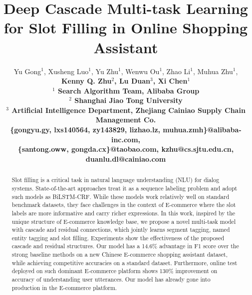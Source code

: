 \documentclass[letterpaper]{article} %
\begin{document}
%
\title{Deep Cascade Multi-task Learning for Slot Filling in Online Shopping Assistant}

\author{
	Yu Gong{$^{1}$\footnotemark[1]\footnotemark[2]},
	Xusheng Luo{$^{1}$\footnotemark[1]},
	Yu Zhu{$^{1}$},
	Wenwu Ou{$^{1}$},
	Zhao Li{$^{1}$},
	Muhua Zhu{$^{1}$},\\
	\bf{\Large{Kenny Q. Zhu{$^{2}$},
	Lu Duan{$^{3}$},
	Xi Chen{$^{1}$}}} \\
	{$^{1}$} Search Algorithm Team, Alibaba Group \\
	{$^{2}$} Shanghai Jiao Tong University \\
	{$^{3}$} Artificial Intelligence Department, Zhejiang Cainiao Supply Chain Management Co.\\
	\{gongyu.gy, lxs140564, zy143829, lizhao.lz, muhua.zmh\}@alibaba-inc.com, \\
	\{santong.oww, gongda.cx\}@taobao.com, kzhu@cs.sjtu.edu.cn, duanlu.dl@cainiao.com
}

\maketitle
\begin{abstract}
Slot filling is a critical task in natural language understanding
(NLU) for dialog systems.
State-of-the-art approaches treat it as a sequence labeling problem
and adopt such models as BiLSTM-CRF.
While these models work relatively well on standard 
benchmark datasets, they face challenges in the context of
E-commerce where the slot labels are more informative
and carry richer expressions.
In this work, inspired by the unique structure of E-commerce knowledge base,
we propose a novel multi-task model
with cascade and residual connections, which 
jointly learns segment tagging, named entity tagging and slot filling.
Experiments show the effectiveness of the proposed
cascade and residual structures. 
Our model has a 14.6\% advantage in F1
score over the strong baseline methods on a new Chinese E-commerce
shopping assistant dataset, while achieving competitive accuracies on
a standard dataset.  
Furthermore, online test deployed on such dominant E-commerce platform
shows 130\% improvement on accuracy of understanding user utterances.
Our model has already gone into production in the E-commerce platform.
\end{abstract}

\renewcommand{\thefootnote}{\fnsymbol{footnote}}
\renewcommand{\thefootnote}{\arabic{footnote}}


	

	

	

	




\end{document}
